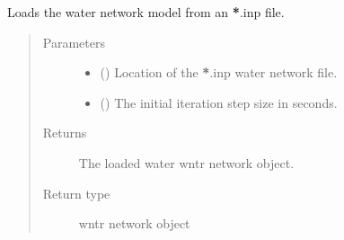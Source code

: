 \documentclass[letterpaper,10pt,english]{sphinxmanual}
\begin{document}
\begin{fulllineitems}
\label{\detokenize{apidoc:dreaminsg_integrated_model.src.network_sim_models.water.water_network_model.load_water_network}}
\sphinxAtStartPar
Loads the water network model from an {\color{red}\bfseries{}*}.inp file.
\begin{quote}\begin{description}
\item[{Parameters}] \leavevmode\begin{itemize}
\item {} 
\sphinxAtStartPar
{} () \textendash{} Location of the {\color{red}\bfseries{}*}.inp water network file.

\item {} 
\sphinxAtStartPar
{} () \textendash{} The initial iteration step size in seconds.

\end{itemize}

\item[{Returns}] \leavevmode
\sphinxAtStartPar
The loaded water wntr network object.

\item[{Return type}] \leavevmode
\sphinxAtStartPar
wntr network object

\end{description}\end{quote}

\end{fulllineitems}

\end{document}
